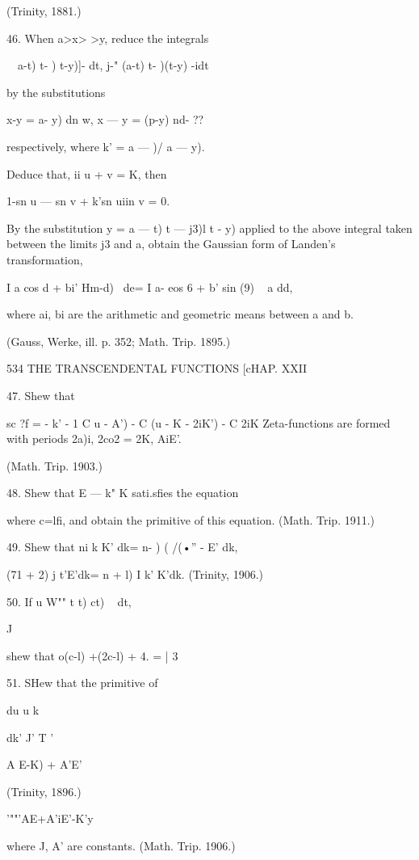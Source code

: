 (Trinity, 1881.)

46. When a>x> >y, reduce the integrals

\ \ a-t) t- ) t-y)]- dt, j-" (a-t) t- )(t-y) -idt

by the substitutions

x-y = a- y) dn w, x — y = (p-y) nd- ??

respectively, where k' = a — )/ a — y).

Deduce that, ii u + v = K, then

1-sn u — sn v + k'sn uiin v = 0.

By the substitution y = a — t) t — j3)l t - y) applied to the above
integral taken between the limits j3 and a, obtain the Gaussian form
of Landen's transformation,

I a cos d + bi' Hm-d)~ de= I a- eos 6 + b' sin (9) ~ a dd,

where ai, bi are the arithmetic and geometric means between a and b.

(Gauss, Werke, ill. p. 352; Math. Trip. 1895.)



534 THE TRANSCENDENTAL FUNCTIONS [cHAP. XXII

47. Shew that

sc ?f = - k' - 1 C u - A') - C (u - K - 2iK') - C 2iK%
Zeta-functions are formed with periods 2a)i, 2co2 = 2K, AiE'.

(Math. Trip. 1903.)

48. Shew that E — k" K sati.sfies the equation

where c=lfi, and obtain the primitive of this equation. (Math. Trip.
1911.)

49. Shew that ni k K' dk= n- ) ( /(•'' - E' dk,

(71 + 2) j t'E'dk= n + l) I k' K'dk. (Trinity, 1906.)

50. If u W"" t t) ct) ~ dt,

  J

shew that o(c-l) +(2c-l) + 4. = | 3

51. SHew that the primitive of

du u k \

dk' J' T '

A E-K) + A'E'



(Trinity, 1896.)



'""'AE+A'iE'-K'y

where J, A' are constants. (Math. Trip. 1906.)

